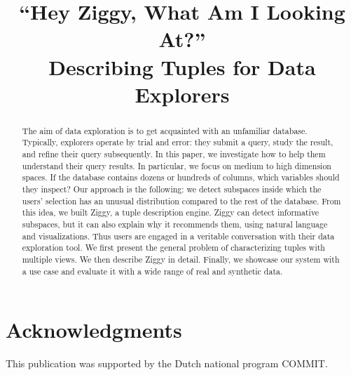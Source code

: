 \documentclass{sig-alternate-2013}
\begin{document}
\title{``Hey Ziggy, What Am I Looking At?''\\
Describing Tuples for Data Explorers}


\maketitle

\begin{abstract} 
The aim of data exploration is to get acquainted with an unfamiliar database.
Typically, explorers operate by trial and error: they submit a query, study the
result, and refine their query subsequently. In this paper, we investigate how
to help them understand their query results. In particular, we focus on medium
to high dimension spaces. If the database contains dozens or hundreds of
columns, which variables should they inspect? Our approach is the following: we
detect subspaces inside which the users' selection has an unusual distribution
compared to the rest of the database. From this idea, we built Ziggy, a tuple
description engine. Ziggy can detect informative subspaces, but it can also
explain why it recommends them, using natural language and visualizations. Thus
users are engaged in a veritable conversation with their data exploration tool.
We first present the general problem of characterizing tuples with multiple
views. We then describe Ziggy in detail. Finally, we showcase our system with a
use case and evaluate it with a wide range of real and synthetic data.
\end{abstract}





\section{Acknowledgments}
This publication was supported by the Dutch national program COMMIT.


\balance

\end{document}
